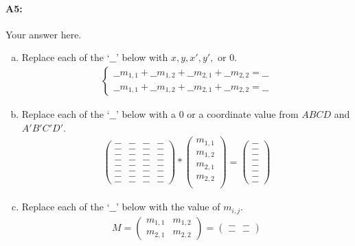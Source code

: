 \paragraph{A5:} Your answer here.

\begin{enumerate}[(a)]

\item Replace each of the `$\_\_$' below with $x, y, x', y',$ or $0$.
\begin{align}
\begin{cases}
    \_\_m_{1,1} + \_\_m_{1,2} + \_\_m_{2,1} + \_\_m_{2,2} = \_\_ \\
    \_\_m_{1,1} + \_\_m_{1,2} + \_\_m_{2,1} + \_\_m_{2,2} = \_\_
\end{cases}
\end{align}

\item Replace each of the `$\_\_$' below with a $0$ or a coordinate value from $ABCD$ and $A'B'C'D'$.
\begin{align}
    \begin{pmatrix} \_\_ & \_\_ & \_\_ & \_\_ \\ \_\_ & \_\_ & \_\_ & \_\_ \\ \_\_ & \_\_ & \_\_ & \_\_ \\ \_\_ & \_\_ & \_\_ & \_\_ \\ \_\_ & \_\_ & \_\_ & \_\_ \\ \_\_ & \_\_ & \_\_ & \_\_ \\ \_\_ & \_\_ & \_\_ & \_\_ \\ \_\_ & \_\_ & \_\_ & \_\_\end{pmatrix} *\begin{pmatrix} m_{1,1} \\ m_{1,2} \\ m_{2,1} \\ m_{2,2} \\ \end{pmatrix} = \begin{pmatrix} \_\_ \\ \_\_ \\ \_\_ \\ \_\_ \\ \_\_ \\ \_\_ \\ \_\_ \\ \_\_ \end{pmatrix}
\end{align}

\item Replace each of the `$\_\_$' below with the value of $m_{i, j}$.
\begin{align}
    M = \begin{pmatrix} m_{1,1} & m_{1,2} \\ m_{2,1} & m_{2,2} \end{pmatrix} = \begin{pmatrix} \_\_ & \_\_ \\ \_\_ & \_\_ \end{pmatrix}
\end{align}

\end{enumerate}

